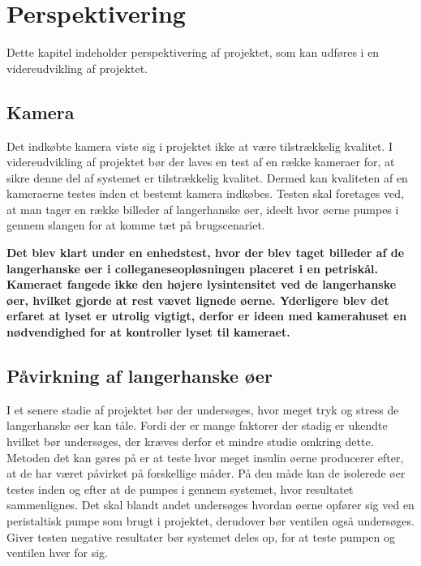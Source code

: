 \chapter{Perspektivering}
Dette kapitel indeholder perspektivering af projektet, som kan udføres i en videreudvikling af projektet.
\section{Kamera}
Det indkøbte kamera viste sig i projektet ikke at være  tilstrækkelig kvalitet. I videreudvikling af projektet bør der laves en test af en række kameraer for, at sikre denne del af systemet er tilstrækkelig kvalitet. Dermed kan kvaliteten af en kameraerne testes inden et bestemt kamera indkøbes. Testen skal foretages ved, at man tager en række billeder af langerhanske øer, ideelt hvor øerne pumpes i gennem slangen for at komme tæt på brugscenariet. 

 \textbf{Det blev klart under en enhedstest, hvor der blev taget billeder af de langerhanske øer i colleganeseopløsningen placeret i en petriskål. Kameraet fangede ikke den højere lysintensitet ved de langerhanske øer, hvilket gjorde at rest vævet lignede øerne. Yderligere blev det erfaret at lyset er utrolig vigtigt, derfor er ideen med kamerahuset en nødvendighed for at kontroller lyset til kameraet.} 
 
\section{Påvirkning af langerhanske øer}
I et senere stadie af projektet bør der undersøges, hvor meget tryk og stress de langerhanske øer kan tåle. Fordi der er mange faktorer der stadig er ukendte hvilket bør undersøges, der kræves derfor et mindre studie omkring dette. Metoden det kan gøres på er at teste hvor meget insulin øerne producerer efter, at de har været påvirket på forskellige måder. På den måde kan de isolerede øer testes inden og efter at de pumpes i gennem systemet, hvor resultatet sammenlignes. Det skal blandt andet undersøges hvordan øerne opfører sig ved en peristaltisk pumpe som brugt i projektet, derudover bør ventilen også undersøges. Giver testen negative resultater bør systemet deles op, for at teste pumpen og ventilen hver for sig.

